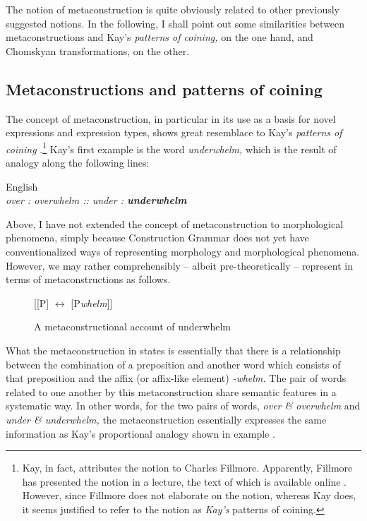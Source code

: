 \documentclass[output=paper, colorlinks,citecolor=brown]{langsci/langscibook}
\begin{document}
The notion of metaconstruction is quite obviously related to other previously suggested notions. In the following, I shall point out some similarities between metaconstructions and Kay’s \textit{patterns of coining,} on the one hand, and Chomskyan transformations, on the other.

\subsection{Metaconstructions and patterns of coining}\label{sec:leino_3.1}

The concept of metaconstruction, in particular in its use as a basis for novel expressions and expression types, shows great resemblace to Kay’s \textit{patterns of coining} \citep{Kay2013}.\footnote{Kay, in fact, attributes the notion to Charles Fillmore. Apparently, Fillmore has presented the notion in a lecture, the text of which is available online \citep{Fillmore1997}. However, since Fillmore does not elaborate on the notion, whereas Kay does, it seems justified to refer to the notion as \textit{Kay’s} patterns of coining.} Kay’s first example is the word \textit{underwhelm,} which is the result of analogy along the following lines:

\ea\label{ex:leino_12} English \citep[33]{Kay2013}\\
\glt \textit{over : overwhelm :: under : \textbf{underwhelm}}\z

Above, I have not extended the concept of metaconstruction to morphological phenomena, simply because Construction Grammar does not yet have conventionalized ways of representing morphology and morphological phenomena. However, we may rather comprehensibly -- albeit pre-theoretically -- represent  in terms of metaconstructions as follows.

\begin{figure}{}
         [[P] $\leftrightarrow $ [P\textit{whelm}]]
        \caption{A metaconstructional account of underwhelm}
        \label{fig:leino_fig10}
\end{figure}

What the metaconstruction in  states is essentially that there is a relationship between the combination of a preposition and another word which consists of that preposition and the affix (or affix-like element) \textit{{}-whelm.} The pair of words related to one another by this metaconstruction share semantic features in a systematic way. In other words, for the two pairs of words, \textit{over \& overwhelm} and \textit{under \& underwhelm,} the metaconstruction essentially expresses the same information as Kay’s proportional analogy shown in example .
\end{document}
